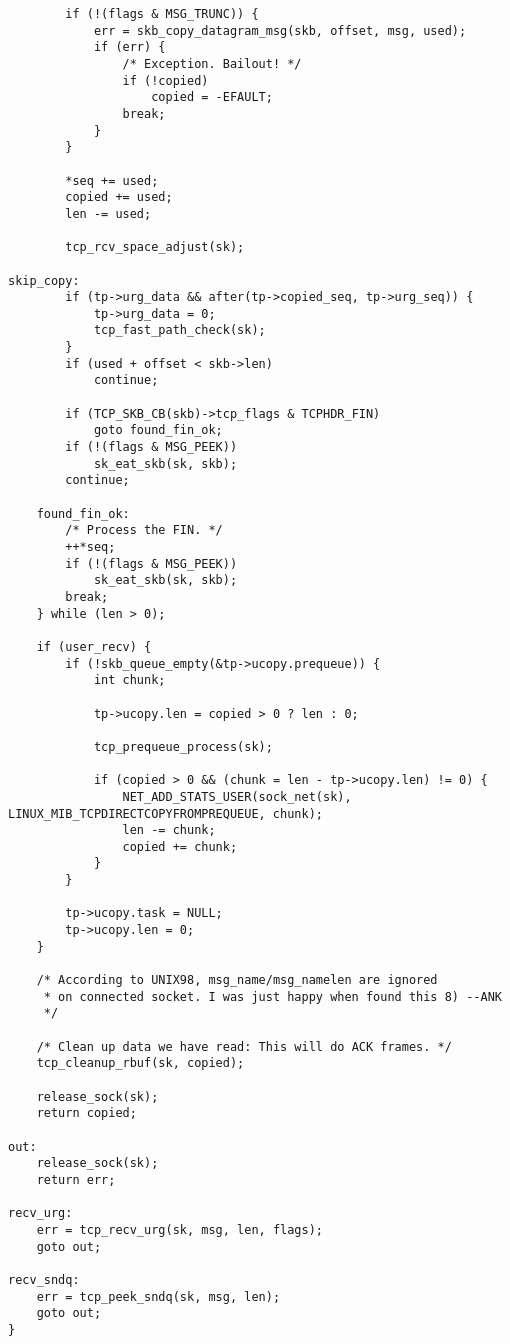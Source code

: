 \begin{verbatim}
		if (!(flags & MSG_TRUNC)) {
			err = skb_copy_datagram_msg(skb, offset, msg, used);
			if (err) {
				/* Exception. Bailout! */
				if (!copied)
					copied = -EFAULT;
				break;
			}
		}

		*seq += used;
		copied += used;
		len -= used;

		tcp_rcv_space_adjust(sk);

skip_copy:
		if (tp->urg_data && after(tp->copied_seq, tp->urg_seq)) {
			tp->urg_data = 0;
			tcp_fast_path_check(sk);
		}
		if (used + offset < skb->len)
			continue;

		if (TCP_SKB_CB(skb)->tcp_flags & TCPHDR_FIN)
			goto found_fin_ok;
		if (!(flags & MSG_PEEK))
			sk_eat_skb(sk, skb);
		continue;

	found_fin_ok:
		/* Process the FIN. */
		++*seq;
		if (!(flags & MSG_PEEK))
			sk_eat_skb(sk, skb);
		break;
	} while (len > 0);

	if (user_recv) {
		if (!skb_queue_empty(&tp->ucopy.prequeue)) {
			int chunk;

			tp->ucopy.len = copied > 0 ? len : 0;

			tcp_prequeue_process(sk);

			if (copied > 0 && (chunk = len - tp->ucopy.len) != 0) {
				NET_ADD_STATS_USER(sock_net(sk), LINUX_MIB_TCPDIRECTCOPYFROMPREQUEUE, chunk);
				len -= chunk;
				copied += chunk;
			}
		}

		tp->ucopy.task = NULL;
		tp->ucopy.len = 0;
	}

	/* According to UNIX98, msg_name/msg_namelen are ignored
	 * on connected socket. I was just happy when found this 8) --ANK
	 */

	/* Clean up data we have read: This will do ACK frames. */
	tcp_cleanup_rbuf(sk, copied);

	release_sock(sk);
	return copied;

out:
	release_sock(sk);
	return err;

recv_urg:
	err = tcp_recv_urg(sk, msg, len, flags);
	goto out;

recv_sndq:
	err = tcp_peek_sndq(sk, msg, len);
	goto out;
}
\end{verbatim}
